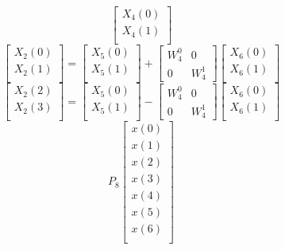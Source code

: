 \documentclass[journal,12pt,twocolumn]{IEEEtran}
\renewcommand\thesection{\arabic{section}}
\begin{document}
\begin{enumerate}[label=\arabic*.,ref=\thesection.\theenumi]
\begin{equation}
\begin{bmatrix}
		X_{4}(0) \\ 
		X_{4}(1) \\ 
	\end{bmatrix}
\end{equation}
\begin{equation}
	\begin{bmatrix}
		X_{2}(0) \\ 
		X_{2}(1)\\ 
	\end{bmatrix}
	=
	\begin{bmatrix}
		X_{5}(0) \\ 
		X_{5}(1)\\ 
	\end{bmatrix}
	+
	\begin{bmatrix}
		W^{0}_{4} & 0\\
		0 & W^{1}_{4}
	\end{bmatrix}
	\begin{bmatrix}
		X_{6}(0) \\ 
		X_{6}(1) \\ 
	\end{bmatrix}
\end{equation}
\begin{equation}
	\begin{bmatrix}
		X_{2}(2) \\ 
		X_{2}(3)\\ 
	\end{bmatrix}
	=
	\begin{bmatrix}
		X_{5}(0) \\ 
		X_{5}(1)\\ 
	\end{bmatrix}
	-
	\begin{bmatrix}
		W^{0}_{4} & 0\\
		0 & W^{1}_{4}
	\end{bmatrix}
	\begin{bmatrix}
		X_{6}(0) \\ 
		X_{6}(1) \\ 
	\end{bmatrix}
\end{equation}
\begin{equation}
	P_{8}
	\begin{bmatrix}
		x(0) \\ 
		x(1) \\ 
		x(2) \\ 
		x(3) \\ 
		x(4) \\ 
		x(5) \\
		x(6) \\

\end{bmatrix}
\end{equation}
\end{enumerate}
\end{document}
